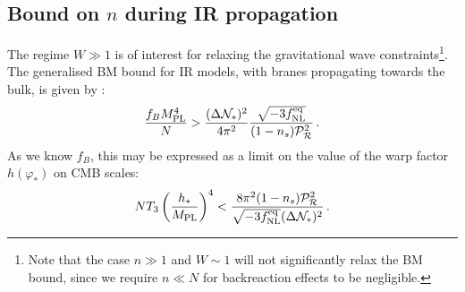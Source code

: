 \subsection{\texorpdfstring{Bound on $n$ during IR propagation}{Bound on n during IR propagation}}

The regime $W \gg 1$ is of interest for 
relaxing the gravitational wave constraints\footnote{Note that 
the case $n \gg 1$ and
$W \sim 1$ will not significantly relax the BM bound, 
since we require $n \ll N$ for backreaction effects to be negligible.}. 
The generalised BM bound for IR models, with branes propagating towards the bulk, is given by 
:
% 
\begin{equation}
\label{eq:f2IRlower-multi}
\frac{f_BM_{\mathrm{PL}}^4}{N} > \frac{(\Delta \mathcal{N}_*)^2}{4\pi^2}
\frac{\sqrt{-3f_{\mathrm{NL}}^{\mathrm{eq}}}}{(1-n_s)\mathcal{P}_{\mathcal{R}}^2 }  \,.
\end{equation}
% 
As we know $f_B$, this may be expressed as 
a limit on the value of the warp factor $h(\varphi_*)$ on CMB scales: 
% 
\begin{equation}
\label{eq:warptorelax}
N T_3 \left(\frac{h_*}{M_{\mathrm{PL}}}\right)^4 < 
\frac{8\pi^2 (1-n_s)\mathcal{P}_{\mathcal{R}}^2 }{\sqrt{-3f_{\mathrm{NL}}^{\mathrm{eq}}}(\Delta \mathcal{N}_*)^2} \,.
\end{equation}
% 


